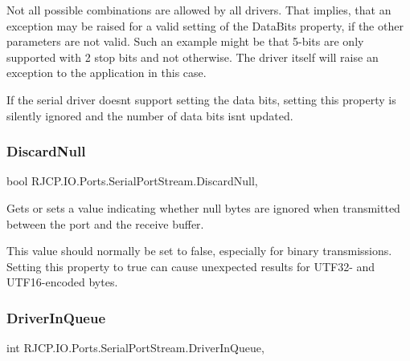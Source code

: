 Not all possible combinations are allowed by all drivers. That implies, that an exception may be raised for a valid setting of the Data\+Bits property, if the other parameters are not valid. Such an example might be that 5-\/bits are only supported with 2 stop bits and not otherwise. The driver itself will raise an exception to the application in this case.

If the serial driver doesn\textquotesingle{}t support setting the data bits, setting this property is silently ignored and the number of data bits isn\textquotesingle{}t updated.\mbox{\label{class_r_j_c_p_1_1_i_o_1_1_ports_1_1_serial_port_stream_aa77dd171f67147b88fb42f9ed95a591a}} 
\subsubsection{\texorpdfstring{DiscardNull}{DiscardNull}}
{\footnotesize\ttfamily bool R\+J\+C\+P.\+I\+O.\+Ports.\+Serial\+Port\+Stream.\+Discard\+Null\hspace{0.3cm}{\ttfamily [get]}, {\ttfamily [set]}}



Gets or sets a value indicating whether null bytes are ignored when transmitted between the port and the receive buffer. 

This value should normally be set to false, especially for binary transmissions. Setting this property to true can cause unexpected results for U\+T\+F32-\/ and U\+T\+F16-\/encoded bytes. \mbox{\label{class_r_j_c_p_1_1_i_o_1_1_ports_1_1_serial_port_stream_ac19238da373e65d986832efeb335ccb0}} 
\subsubsection{\texorpdfstring{DriverInQueue}{DriverInQueue}}
{\footnotesize\ttfamily int R\+J\+C\+P.\+I\+O.\+Ports.\+Serial\+Port\+Stream.\+Driver\+In\+Queue\hspace{0.3cm}{\ttfamily [get]}, {\ttfamily [set]}}



